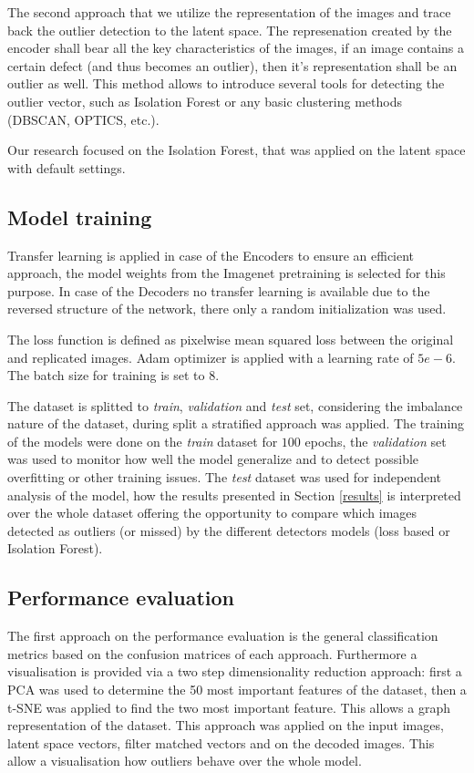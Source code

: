 The second approach that we utilize the representation of the images and trace back the outlier
detection to the latent space.
The represenation created by the encoder shall bear all the key characteristics of the images,
if an image contains a certain defect (and thus becomes an outlier), then it's representation
shall be an outlier as well.
This method allows to introduce several tools for detecting the outlier vector,
such as Isolation Forest or any basic clustering methods (DBSCAN, OPTICS, etc.).

Our research focused on the Isolation Forest, that was applied on the latent space with default
settings.

\subsection{Model training}
Transfer learning is applied in case of the Encoders to ensure an efficient approach,
the model weights from the Imagenet pretraining is selected for this purpose.
In case of the Decoders no transfer learning is available due to the reversed structure
of the network, there only a random initialization was used.

The loss function is defined as pixelwise mean squared loss between the original and replicated
images.
Adam optimizer is applied with a learning rate of $5e-6$.
The batch size for training is set to 8.

The dataset is splitted to \emph{train}, \emph{validation} and \emph{test} set, considering the
imbalance nature of the dataset, during split a stratified approach was applied.
The training of the models were done on the \emph{train} dataset for $100$ epochs,
the \emph{validation} set was used to monitor how well the model generalize and to detect possible
overfitting or other training issues.
The \emph{test} dataset was used for independent analysis of the model, how the results presented
in Section \ref{results} is interpreted over the whole dataset offering the opportunity to compare
which images detected as outliers (or missed) by the different detectors models (loss based or
Isolation Forest).

\subsection{Performance evaluation}
The first approach on the performance evaluation is the general classification metrics based on
the confusion matrices of each approach.
Furthermore a visualisation is provided via a two step dimensionality reduction approach:
first a PCA was used to determine the 50 most important features of the dataset,
then a t-SNE was applied to find the two most important feature.
This allows a graph representation of the dataset.
This approach was applied on the input images, latent space vectors, filter matched vectors and on
the decoded images.
This allow a visualisation how outliers behave over the whole model.

